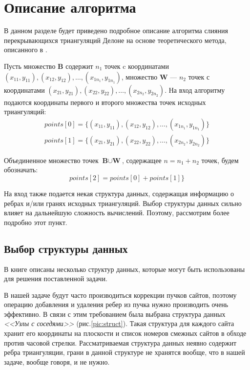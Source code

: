 \documentclass[12pt]{article}
\begin{document}
\section{Описание алгоритма}
В данном разделе будет приведено подробное описание алгоритма слияния перекрывающихся триангуляций Делоне
на основе теоретического метода, описанного в \cite{MestOverlap}.

Пусть множество $\textbf{B}$ содержит $n_1$ точек c координатами
$(x_{11}, y_{11}), (x_{12}, y_{12}), \ldots, (x_{1n_1}, y_{1n_1})$,
множество $\textbf{W}$ --- $n_2$ точек с координатами
$(x_{21}, y_{21}), (x_{22}, y_{22}), \ldots, (x_{2n_2}, y_{2n_2})$.
На вход алгоритму подаются координаты первого и второго множества точек исходных триангуляций:
\begin{equation}\label{eq:points01}
\begin{split}
	points[0] = \{(x_{11}, y_{11}), (x_{12}, y_{12}), \ldots, (x_{1n_1}, y_{1n_1}) \} \\
	points[1] = \{(x_{21}, y_{21}), (x_{22}, y_{22}), \ldots, (x_{2n_2}, y_{2n_2}) \}
\end{split}
\end{equation}

Объединенное множество точек $\textbf{B} \cup \textbf{W}$,
содержащее $n = n_1 + n_2$ точек, будем обозначать:
\begin{equation}\label{eq:points2}
	points[2] = points[0] + points[1]\}
\end{equation}

На вход также подается некая структура данных, содержащая информацию о ребрах и/или гранях исходных триангуляций.
Выбор структуры данных сильно влияет на дальнейшую сложность вычислений.
Поэтому, рассмотрим более подробно этот пункт.

\subsection{Выбор структуры данных}
В книге \cite[стр. 11-17]{Skvortsov} описаны несколько структур данных,
которые могут быть использованы для решения поставленной задачи.

В нашей задаче будут часто производиться коррекции пучков сайтов,
поэтому операцию добавления и удаления ребер из пучка нужно производить очень эффективно.
В связи с этим требованием была выбрана структура данных {\itshape <<Узлы с соседями>>} (рис.\ref{pic:struct}).
Такая структура для каждого сайта хранит его координаты на плоскости и список номеров смежных сайтов в обходе против часовой стрелки.
Рассматриваемая структура данных неявно содержит ребра триангуляции, грани в данной структуре не хранятся вообще,
что в нашей задаче, вообще говоря, и не нужно.
\end{document}

